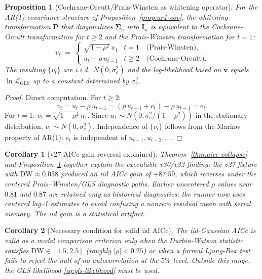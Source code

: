 \documentclass[11pt]{article}
\newtheorem{proposition}{Proposition}
\newtheorem{corollary}{Corollary}
\begin{document}
\begin{proposition}[Cochrane-Orcutt/Prais-Winsten as whitening operator]\label{prop:co-pw}
For the AR(1) covariance structure of Proposition~\ref{prop:ar1-cov}, the whitening transformation $\bm{P}$ that diagonalizes $\bm{\Sigma}_u$ into $\bm{I}_n$ is equivalent to the Cochrane-Orcutt transformation for $t\geq 2$ and the Prais-Winsten transformation for $t=1$:
\[
v_t\;=\;\begin{cases}
\sqrt{1-\rho^2}\,u_1 & t=1 \quad\text{(Prais-Winsten)},\\
u_t-\rho\,u_{t-1} & t\geq 2 \quad\text{(Cochrane-Orcutt)}.
\end{cases}
\]
The resulting $\{v_t\}$ are i.i.d.\ $N(0,\sigma_e^2)$ and the log-likelihood based on $\bm{v}$ equals $\ln\mathcal{L}_{\mathrm{GLS}}$ up to a constant determined by $\sigma_e^2$.
\end{proposition}

\begin{proof}
Direct computation. For $t\geq 2$:
\[
v_t=u_t-\rho\,u_{t-1}=(\rho\,u_{t-1}+e_t)-\rho\,u_{t-1}=e_t.
\]
For $t=1$: $v_1=\sqrt{1-\rho^2}\,u_1$. Since $u_1\sim N(0,\sigma_e^2/(1-\rho^2))$ in the stationary distribution, $v_1\sim N(0,\sigma_e^2)$. Independence of $\{v_t\}$ follows from the Markov property of AR(1): $e_t$ is independent of $u_{t-1},u_{t-2},\ldots$.
\end{proof}

\begin{corollary}[v27 AICc gain reversal explained]
Theorem~\ref{thm:aicc-collapse} and Proposition~\ref{prop:co-pw} together explain the executable v30/v32 finding: the v27 fixture with $\mathrm{DW}\approx0.038$ produced an iid AICc gain of $+87.59$, which reverses under the centered Prais--Winsten/GLS diagnostic paths. Earlier uncentered $\rho$ values near $0.81$ and $0.87$ are retained only as historical diagnostics; the runner now uses centered lag--1 estimates to avoid confusing a nonzero residual mean with serial memory. The iid gain is a statistical artifact.
\end{corollary}

\begin{corollary}[Necessary condition for valid iid AICc]
The iid-Gaussian AICc is valid as a model comparison criterion only when the Durbin-Watson statistic satisfies $\mathrm{DW}\in[1.5,2.5]$ (roughly $|\rho|<0.25$) or when a formal Ljung-Box test fails to reject the null of no autocorrelation at the $5\%$ level. Outside this range, the GLS likelihood \eqref{eq:gls-likelihood} must be used.
\end{corollary}
\end{document}
